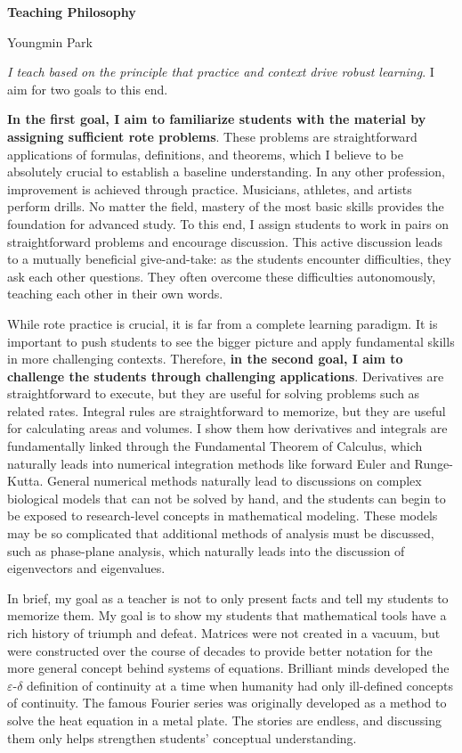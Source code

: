 \documentclass[a4paper,11pt]{article}
\begin{document}
\begin{center}
\Large \textbf{Teaching Philosophy}

\Large Youngmin Park
\end{center}

\textit{I teach based on the principle that practice and context drive robust learning}. I aim for two goals to this end.

\textbf{In the first goal, I aim to familiarize students with the material by assigning sufficient rote problems}. These problems are straightforward applications of formulas, definitions, and theorems, which I believe to be absolutely crucial to establish a baseline understanding. In any other profession, improvement is achieved through practice. Musicians, athletes, and artists perform drills. No matter the field, mastery of the most basic skills provides the foundation for advanced study. To this end, I assign students to work in pairs on straightforward problems and encourage discussion. This active discussion leads to a mutually beneficial give-and-take:  as the students encounter difficulties, they ask each other questions. They often overcome these difficulties autonomously, teaching each other in their own words.

While rote practice is crucial, it is far from a complete learning paradigm. It is important to push students to see the bigger picture and apply fundamental skills in more challenging contexts. Therefore, \textbf{in the second goal, I aim to challenge the students through challenging applications}. Derivatives are straightforward to execute, but they are useful for solving problems such as related rates. Integral rules are straightforward to memorize, but they are useful for calculating areas and volumes. I show them how derivatives and integrals are fundamentally linked through the Fundamental Theorem of Calculus, which naturally leads into numerical integration methods like forward Euler and Runge-Kutta. General numerical methods naturally lead to discussions on complex biological models that can not be solved by hand, and the students can begin to be exposed to research-level concepts in mathematical modeling. These models may be so complicated that additional methods of analysis must be discussed, such as phase-plane analysis, which naturally leads into the discussion of eigenvectors and eigenvalues.

In brief, my goal as a teacher is not to only present facts and tell my students to memorize them. My goal is to show my students that mathematical tools have a rich history of triumph and defeat. Matrices were not created in a vacuum, but were constructed over the course of decades to provide better notation for the more general concept behind systems of equations. Brilliant minds developed the $\varepsilon$-$\delta$ definition of continuity at a time when humanity had only ill-defined concepts of continuity. The famous Fourier series was originally developed as a method to solve the heat equation in a metal plate. The stories are endless, and discussing them only helps strengthen students' conceptual understanding.
\end{document}
